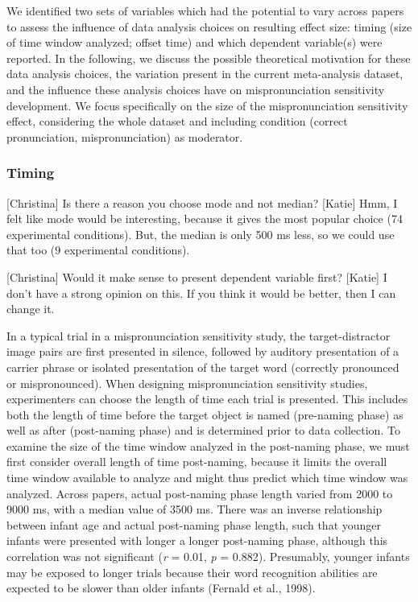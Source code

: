 \documentclass[man]{apa6}
\theoremstyle{definition}
\theoremstyle{definition}
\theoremstyle{definition}
\theoremstyle{remark}
\begin{document}
We identified two sets of variables which had the potential to vary
across papers to assess the influence of data analysis choices on
resulting effect size: timing (size of time window analyzed; offset
time) and which dependent variable(s) were reported. In the following,
we discuss the possible theoretical motivation for these data analysis
choices, the variation present in the current meta-analysis dataset, and
the influence these analysis choices have on mispronunciation
sensitivity development. We focus specifically on the size of the
mispronunciation sensitivity effect, considering the whole dataset and
including condition (correct pronunciation, mispronunciation) as
moderator.

\subsubsection{Timing}\label{timing}

{[}Christina{]} Is there a reason you choose mode and not median?
{[}Katie{]} Hmm, I felt like mode would be interesting, because it gives
the most popular choice (74 experimental conditions). But, the median is
only 500 ms less, so we could use that too (9 experimental conditions).

{[}Christina{]} Would it make sense to present dependent variable first?
{[}Katie{]} I don't have a strong opinion on this. If you think it would
be better, then I can change it.

In a typical trial in a mispronunciation sensitivity study, the
target-distractor image pairs are first presented in silence, followed
by auditory presentation of a carrier phrase or isolated presentation of
the target word (correctly pronounced or mispronounced). When designing
mispronunciation sensitivity studies, experimenters can choose the
length of time each trial is presented. This includes both the length of
time before the target object is named (pre-naming phase) as well as
after (post-naming phase) and is determined prior to data collection. To
examine the size of the time window analyzed in the post-naming phase,
we must first consider overall length of time post-naming, because it
limits the overall time window available to analyze and might thus
predict which time window was analyzed. Across papers, actual
post-naming phase length varied from 2000 to 9000 ms, with a median
value of 3500 ms. There was an inverse relationship between infant age
and actual post-naming phase length, such that younger infants were
presented with longer a longer post-naming phase, although this
correlation was not significant (\emph{r} = 0.01, \emph{p} = 0.882).
Presumably, younger infants may be exposed to longer trials because
their word recognition abilities are expected to be slower than older
infants (Fernald et al., 1998).
\end{document}

